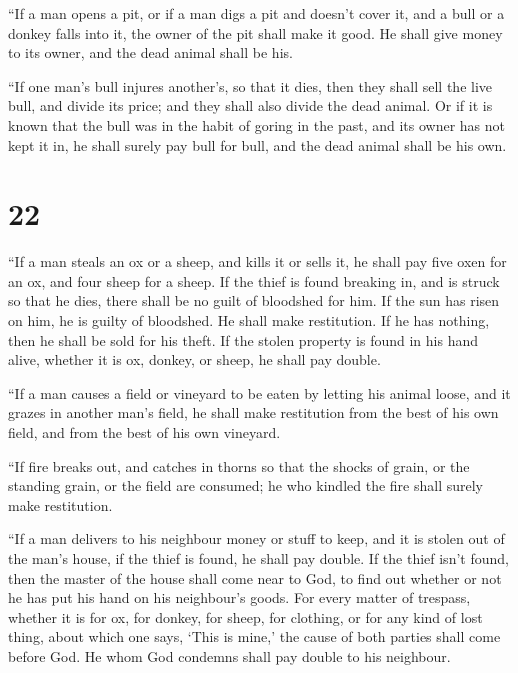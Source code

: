  ``If a man opens a pit, or if a man digs a pit and
doesn't cover it, and a bull or a donkey falls into it, 
the owner of the pit shall make it good. He shall give money to its
owner, and the dead animal shall be his.

 ``If one man's bull injures another's, so that it dies,
then they shall sell the live bull, and divide its price; and they shall
also divide the dead animal.  Or if it is known that the
bull was in the habit of goring in the past, and its owner has not kept
it in, he shall surely pay bull for bull, and the dead animal shall be
his own.

\hypertarget{section-21}{%
\section{22}\label{section-21}}

 ``If a man steals an ox or a sheep, and kills it or sells
it, he shall pay five oxen for an ox, and four sheep for a sheep.
 If the thief is found breaking in, and is struck so that
he dies, there shall be no guilt of bloodshed for him.  If
the sun has risen on him, he is guilty of bloodshed. He shall make
restitution. If he has nothing, then he shall be sold for his theft.
 If the stolen property is found in his hand alive,
whether it is ox, donkey, or sheep, he shall pay double.

 ``If a man causes a field or vineyard to be eaten by
letting his animal loose, and it grazes in another man's field, he shall
make restitution from the best of his own field, and from the best of
his own vineyard.

 ``If fire breaks out, and catches in thorns so that the
shocks of grain, or the standing grain, or the field are consumed; he
who kindled the fire shall surely make restitution.

 ``If a man delivers to his neighbour money or stuff to
keep, and it is stolen out of the man's house, if the thief is found, he
shall pay double.  If the thief isn't found, then the
master of the house shall come near to God, to find out whether or not
he has put his hand on his neighbour's goods.  For every
matter of trespass, whether it is for ox, for donkey, for sheep, for
clothing, or for any kind of lost thing, about which one says, `This is
mine,' the cause of both parties shall come before God. He whom God
condemns shall pay double to his neighbour.

